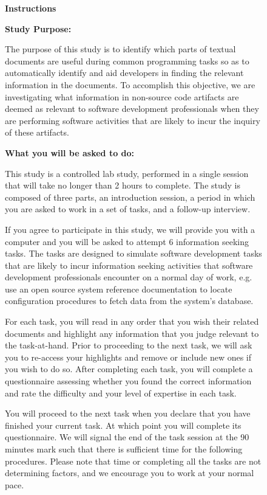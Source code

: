 

\begin{figure}
\begin{mdframed}[backgroundcolor=gray!05] 
\begin{footnotesize}

{\large \textbf{Instructions}} \bigskip


\textbf{Study Purpose:} \medskip

The purpose of this study is to identify which parts of textual documents are useful during common programming tasks so as to automatically identify and aid developers in finding the relevant information in the documents. To accomplish this objective, we are investigating what information in non-source code artifacts are deemed as relevant to software development professionals when they are performing software activities that are likely to incur the inquiry of these artifacts. \medskip

\textbf{What you will be asked to do:} \medskip


This study is a controlled lab study, performed in a single session that will take no longer than 2 hours to complete. The study is composed of three parts, an introduction session, a period in which you are asked to work in a set of tasks, and a follow-up interview.  \medskip

If you agree to participate in this study, we will provide you with a computer and you will be asked to attempt 6 information seeking tasks. The tasks are designed to simulate software development tasks that are likely to incur information seeking activities that software development professionals encounter on a normal day of work, e.g. use an open source system reference documentation to locate configuration procedures to fetch data from the system’s database.  \medskip

For each task, you will read in any order that you wish their related documents and highlight any information that you judge relevant to the task-at-hand. Prior to proceeding to the next task, we will ask you to re-access your highlights and remove or include new ones if you wish to do so. After completing each task, you will complete a questionnaire assessing whether you found the correct information and rate the difficulty and your level of expertise in each task.  \medskip

You will proceed to the next task when you declare that you have finished your current task. At which point you will complete its questionnaire. We will signal the end of the task session at the 90 minutes mark such that there is sufficient time for the following procedures. Please note that time or completing all the tasks are not determining factors, and we encourage you to work at your normal pace.  \medskip


\end{footnotesize}
\end{mdframed}
\end{figure}
